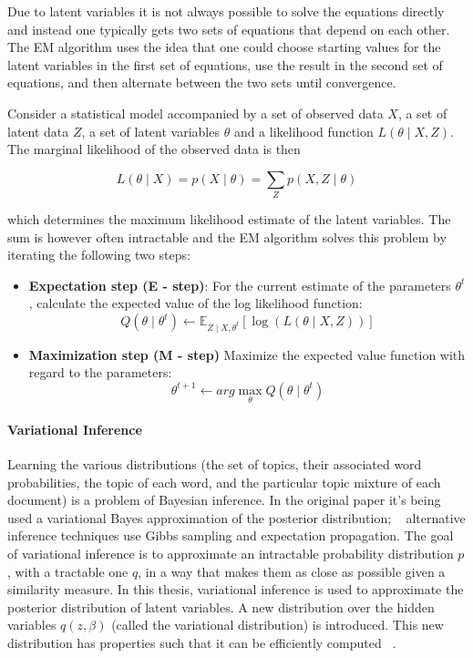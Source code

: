 \documentclass[12pt]{report}
\begin{document}
Due to latent variables it is not always possible to solve the equations
directly and instead one typically gets two sets of equations that depend on
each other. The EM algorithm uses the idea that one could choose starting
values for the latent variables in the first set of equations, use the result
in the second set of equations, and then alternate between the two sets until
convergence.

Consider a statistical model accompanied by a set of observed data $X$, a set of
latent data $Z$, a set of latent variables $\theta$ and a likelihood function
$L(\theta \mid X, Z)$. The marginal likelihood of the observed data is then

\begin{equation}
L(\theta \mid X) = p(X \mid \theta) = \sum\limits_{Z} p(X, Z \mid \theta)
\end{equation}

which determines the maximum likelihood estimate of the latent variables. The
sum is however often intractable and the EM algorithm solves this problem by
iterating the following two steps:

\begin{itemize}
\item \textbf{Expectation step (E - step)}: For the current estimate of the 
parameters $\theta^t$, calculate the expected value of the log likelihood function:
\begin{equation}
Q(\theta \mid \theta^t) \leftarrow \mathbb{E}_{Z \mid X, \theta^t}
 [\log(L(\theta \mid X, Z))]
\end{equation}
\item \textbf{Maximization step (M - step)} Maximize the expected value function 
with regard to the parameters:
\begin{equation}
\theta^{t + 1} \leftarrow arg \max\limits_{\theta} Q(\theta \mid \theta^t)
\end{equation}
\end{itemize}

\paragraph{Variational Inference}

Learning the various distributions (the set of topics, their associated word
probabilities, the topic of each word, and the particular topic mixture of each
document) is a problem of Bayesian inference. In the original paper it's being
used a variational Bayes approximation of the posterior distribution;
~\cite{blei2003latent} alternative inference techniques use Gibbs sampling and
expectation propagation. The goal of variational inference is to approximate an
intractable probability distribution $p$, with a tractable one $q$, in a way
that makes them as close as possible given a similarity measure. In this thesis,
variational inference is used to approximate the posterior distribution of
latent variables. A new distribution over the hidden variables $q(z, \beta)$
(called the variational distribution) is  introduced. This new distribution has
properties such that it can be efficiently computed ~\cite{Fox2011ATO}. 
\end{document}
